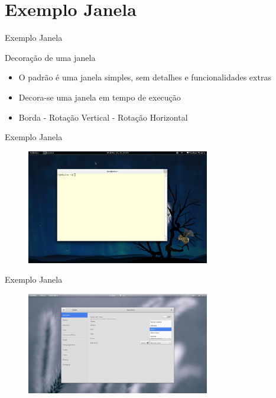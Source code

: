 \section{Exemplo Janela}

\begin{frame}{Exemplo Janela}{}
\begin{block}{Decoração de uma janela}
  \begin{itemize}
    \item<1-> O padrão é uma janela simples, sem detalhes e funcionalidades extras
    \item<1-> Decora-se uma janela em tempo de execução
    \item<1-> Borda - Rotação Vertical - Rotação Horizontal
  \end{itemize}
\end{block}
\end{frame}


\begin{frame}{Exemplo Janela}{}
\begin{block}{}
  \begin{figure}
    \includegraphics[width=8cm]{figuras/janela}
  \end{figure}
\end{block}
\end{frame}

\begin{frame}{Exemplo Janela}{}
\begin{block}{}
  \begin{figure}
    \includegraphics[width=8cm]{figuras/window_decorator}
  \end{figure}
\end{block}
\end{frame}
